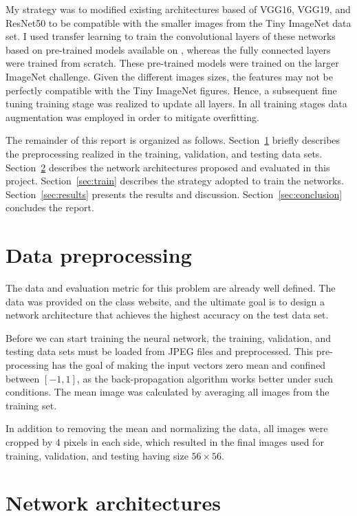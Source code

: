 \documentclass[10pt,twocolumn,letterpaper]{article}
\begin{document}
My strategy was to modified existing architectures based of VGG16, VGG19, and ResNet50 to be compatible with the smaller images from the Tiny ImageNet data set. I used transfer learning to train the convolutional layers of these networks based on pre-trained models available on \cite{Pretrained-Models}, whereas the fully connected layers were trained from scratch. These pre-trained models were trained on the larger ImageNet challenge. Given the different images sizes, the features may not be perfectly compatible with the Tiny ImageNet figures. Hence, a subsequent fine tuning training stage was realized to update all layers. In all training stages data augmentation was employed in order to mitigate overfitting.

The remainder of this report is organized as follows. Section~\ref{sec:preprocess} briefly describes the preprocessing realized in the training, validation, and testing data sets. Section~\ref{sec:architecture} describes the network architectures proposed and evaluated in this project. Section~\ref{sec:train} describes the strategy adopted to train the networks. Section~\ref{sec:results} presents the results and discussion. Section~\ref{sec:conclusion} concludes the report.

\section{Data preprocessing} \label{sec:preprocess}

The data and evaluation metric for this problem are already well defined. The data was provided on the class website, and the ultimate goal is to design a network architecture that achieves the highest accuracy on the test data set. 

Before we can start training the neural network, the training, validation, and testing data sets must be loaded from JPEG files and preprocessed. This pre-processing has the goal of making the input vectors zero mean and confined between $[-1, 1]$, as the back-propagation algorithm works better under such conditions. The mean image was calculated by averaging all images from the training set. 

In addition to removing the mean and normalizing the data, all images were cropped by 4 pixels in each side, which resulted in the final images used for training, validation, and testing having size $56 \times 56$. 

\section{Network architectures} \label{sec:architecture}
\end{document}
